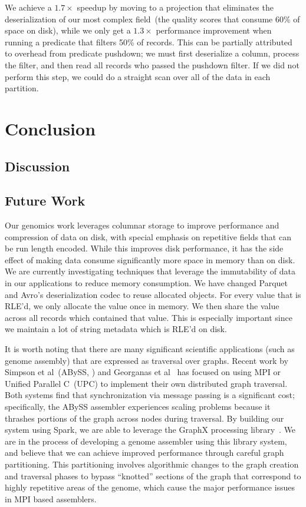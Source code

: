 \documentclass[masters]{ucbthesis}
\begin{document}
We achieve a $1.7\times$ speedup by moving to a projection that eliminates the deserialization of our most
complex field~(the quality scores that consume 60\% of space on disk), while we only get a $1.3\times$
performance improvement when running a predicate that filters 50\% of records. This can be partially attributed
to overhead from predicate pushdown; we must first deserialize a column, process the filter, and then read all
records who passed the pushdown filter. If we did not perform this step, we could do a straight scan over all of
the data in each partition.

\chapter{Conclusion}

\section{Discussion}
\label{sec:discussion}

\section{Future Work}
\label{sec:future-work}

Our genomics work leverages columnar storage to improve performance and compression of data on disk,
with special emphasis on repetitive fields that can be run length encoded. While this improves
disk performance, it has the side effect of making data consume significantly more space in memory
than on disk. We are currently investigating techniques that leverage the immutability of data in our
applications to reduce memory consumption. We have changed Parquet and Avro's deserialization codec
to reuse allocated objects. For every value that is RLE'd, we only allocate the value once in memory. We
then share the value across all records which contained that value. This is especially important since we
maintain a lot of string metadata which is RLE'd on disk.

It is worth noting that there are many significant scientific applications (such as genome
assembly) that are expressed as traversal over graphs. Recent work by Simpson et al~(ABySS,
\cite{simpson09}) and Georganas et al~\cite{georganas14} has focused on using MPI
or Unified Parallel C~(UPC) to implement their own distributed graph traversal. Both systems
find that synchronization via message passing is a significant cost; specifically, the ABySS assembler
experiences scaling problems because it thrashes portions of the graph across nodes during traversal.
By building our system using Spark, we are able to leverage the GraphX processing library~\cite{gonzalez14,
xin13}. We are in the process of developing a genome assembler using this library system, and
believe that we can achieve improved performance through careful graph partitioning. This partitioning involves
algorithmic changes to the graph creation and traversal phases to bypass ``knotted'' sections of the
graph that correspond to highly repetitive areas of the genome, which cause the major performance
issues in MPI based assemblers.
\end{document}
